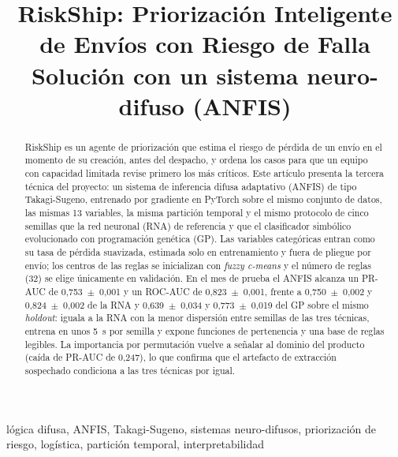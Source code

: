 \documentclass[conference]{IEEEtran}
\begin{document}
\title{RiskShip: Priorización Inteligente de Envíos con Riesgo de Falla\\
{\large Solución con un sistema neuro-difuso (ANFIS)}}

\author{
}

\maketitle

\begin{abstract}
RiskShip es un agente de priorización que estima el riesgo de pérdida de un
envío en el momento de su creación, antes del despacho, y ordena los casos para
que un equipo con capacidad limitada revise primero los más críticos. Este
artículo presenta la tercera técnica del proyecto: un sistema de inferencia
difusa adaptativo (ANFIS) de tipo Takagi-Sugeno, entrenado por gradiente en
PyTorch sobre el mismo conjunto de datos, las mismas 13 variables, la misma
partición temporal y el mismo protocolo de cinco semillas que la red neuronal
(RNA) de referencia y que el clasificador simbólico evolucionado con
programación genética (GP). Las variables categóricas entran como su tasa de
pérdida suavizada, estimada solo en entrenamiento y fuera de pliegue por
envío; los centros de las reglas se inicializan con \textit{fuzzy c-means} y
el número de reglas (32) se elige únicamente en validación. En el mes de
prueba el ANFIS alcanza un PR-AUC de 0,753~$\pm$~0,001 y un ROC-AUC de
0,823~$\pm$~0,001, frente a 0,750~$\pm$~0,002 y 0,824~$\pm$~0,002 de la RNA
y 0,639~$\pm$~0,034 y 0,773~$\pm$~0,019 del GP sobre el mismo
\textit{holdout}: iguala a la RNA con la menor dispersión entre semillas de
las tres técnicas, entrena en unos 5~s por semilla y expone funciones de
pertenencia y una base de reglas legibles. La importancia por permutación
vuelve a señalar al dominio del producto (caída de PR-AUC de 0,247), lo que
confirma que el artefacto de extracción sospechado condiciona a las tres
técnicas por igual.
\end{abstract}

\begin{IEEEkeywords}
lógica difusa, ANFIS, Takagi-Sugeno, sistemas neuro-difusos, priorización de
riesgo, logística, partición temporal, interpretabilidad
\end{IEEEkeywords}
\end{document}
